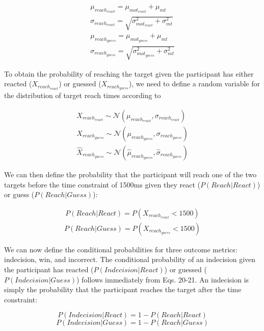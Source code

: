 \documentclass[12pt,letterpaper]{article}
\begin{document}
\begin{align}
    \mu_{reach_{react}} =\mu_{mot_{react}} + \mu_{mt}                      \\
    \sigma_{reach_{react}} = \sqrt{\sigma_{mot_{react}}^2 + \sigma_{mt}^2} \\
    \mu_{reach_{guess}} =\mu_{mot_{guess}} + \mu_{mt}                      \\
    \sigma_{reach_{guess}} = \sqrt{\sigma_{mot_{guess}}^2 + \sigma_{mt}^2}
\end{align}

To obtain the probability of reaching the target given the participant has either reacted ($X_{reach_{react}}$) or guessed ($X_{reach_{guess}}$), we need to define a random variable for the distribution of target reach times according to



\begin{align}
    X_{reach_{react}} \sim \mathcal{N}(\mu_{reach_{react}}, \sigma_{reach_{react}}) \\
    X_{reach_{guess}} \sim \mathcal{N}(\mu_{reach_{guess}}, \sigma_{reach_{guess}}) \\
    \hat{X}_{reach_{guess}} \sim \mathcal{N}(\hat{\mu}_{reach_{guess}}, \hat{\sigma}_{reach_{guess}})
\end{align}

We can then define the probability that the participant will reach one of the two targets before the time constraint of 1500ms given they react ($P(Reach|React)$) or guess ($P(Reach|Guess)$):

\begin{align}
    P(Reach|React) = P(X_{reach_{react}} < 1500)
\end{align}
\begin{align}
    P(Reach|Guess) = P(X_{reach_{guess}} < 1500)
\end{align}

We can now define the conditional probabilities for three outcome metrics: indecision, win, and incorrect. The conditional probability of an indecision given the participant has reacted ($P(Indecision|React)$) or guessed ($P(Indecision|Guess)$) follows immediately from Eqs. 20-21. An indecision is simply the probability that the participant reaches the target after the time constraint:

\begin{equation}
    P(Indecision|React) = 1 - P(Reach|React)
\end{equation}
\begin{equation}
    P(Indecision|Guess) = 1 - P(Reach|Guess)
\end{equation}
\end{document}
